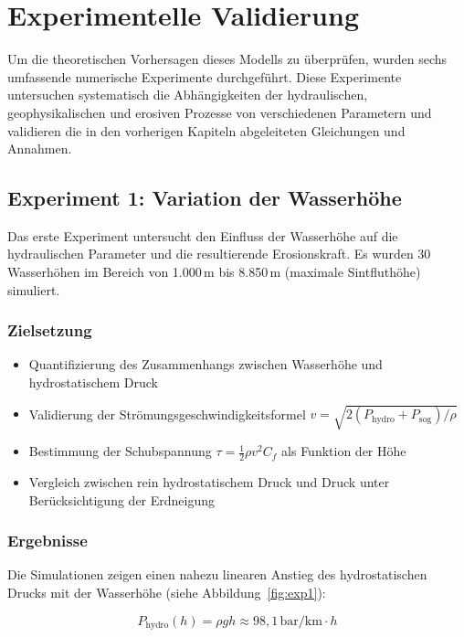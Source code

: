 ﻿\documentclass[12pt,a4paper]{report}
\begin{document}
\chapter{Experimentelle Validierung}

Um die theoretischen Vorhersagen dieses Modells zu überprüfen, wurden sechs umfassende numerische Experimente durchgeführt. Diese Experimente untersuchen systematisch die Abhängigkeiten der hydraulischen, geophysikalischen und erosiven Prozesse von verschiedenen Parametern und validieren die in den vorherigen Kapiteln abgeleiteten Gleichungen und Annahmen.

\section{Experiment 1: Variation der Wasserhöhe}

Das erste Experiment untersucht den Einfluss der Wasserhöhe auf die hydraulischen Parameter und die resultierende Erosionskraft. Es wurden 30 Wasserhöhen im Bereich von 1.000\,m bis 8.850\,m (maximale Sintfluthöhe) simuliert.

\subsection{Zielsetzung}

\begin{itemize}
	\item Quantifizierung des Zusammenhangs zwischen Wasserhöhe und hydrostatischem Druck
	\item Validierung der Strömungsgeschwindigkeitsformel $v = \sqrt{2(P_{\text{hydro}} + P_{\text{sog}})/\rho}$
	\item Bestimmung der Schubspannung $\tau = \frac{1}{2}\rho v^2 C_f$ als Funktion der Höhe
	\item Vergleich zwischen rein hydrostatischem Druck und Druck unter Berücksichtigung der Erdneigung
\end{itemize}

\subsection{Ergebnisse}

Die Simulationen zeigen einen nahezu linearen Anstieg des hydrostatischen Drucks mit der Wasserhöhe (siehe Abbildung~\ref{fig:exp1}):

\begin{equation}
	P_{\text{hydro}}(h) = \rho g h \approx 98{,}1 \, \text{bar/km} \cdot h
\end{equation}
\end{document}
